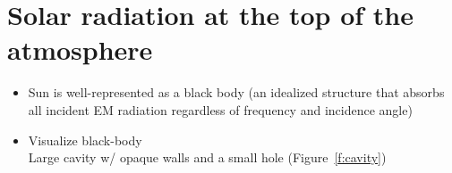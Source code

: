 \documentclass[11pt, oneside]{article}
\begin{document}
\section{Solar radiation at the top of the atmosphere}
\label{s:solar}

\begin{itemize}
	\item Sun is well-represented as a black body (an idealized structure that absorbs all incident EM radiation regardless of frequency and incidence angle)
	\item Visualize black-body\\
	Large cavity w/ opaque walls and a small hole (Figure~\ref{f:cavity})
\end{itemize}
\end{document}
